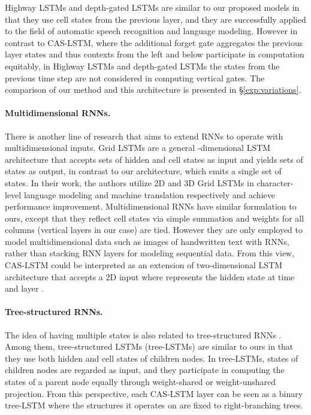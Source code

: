 \documentclass[wcp]{jmlr}
\begin{document}
    Highway LSTMs \citep{zhang2016highway} and depth-gated LSTMs \citep{yao2015depth} are similar to our proposed models in that they use cell states from the previous layer, and they are successfully applied to the field of automatic speech recognition and language modeling.
    However in contrast to CAS-LSTM, where the additional forget gate aggregates the previous layer states and thus contexts from the left and below participate in computation equitably, in Highway LSTMs and depth-gated LSTMs the states from the previous time step are not considered in computing vertical gates.
    The comparison of our method and this architecture is presented in \S\ref{exp:variations}.
    
    \paragraph{Multidimensional RNNs.}
    There is another line of research that aims to extend RNNs to operate with multidimensional inputs.
    Grid LSTMs \citep{kalchbrenner2016grid} are a general -dimensional LSTM architecture that accepts  sets of hidden and cell states as input and yields  sets of states as output, in contrast to our architecture, which emits a single set of states.
    In their work, the authors utilize 2D and 3D Grid LSTMs in character-level language modeling and machine translation respectively and achieve performance improvement.
    Multidimensional RNNs \citep{graves2007mdrnn,graves2009offline} have similar formulation to ours, except that they reflect cell states via simple summation and weights for all columns (vertical layers in our case) are tied.
    However they are only employed to model multidimensional data such as images of handwritten text with RNNs, rather than stacking RNN layers for modeling sequential data.
    From this view, CAS-LSTM could be interpreted as an extension of two-dimensional LSTM architecture that accepts a 2D input  where  represents the hidden state at time  and layer .
    
    \paragraph{Tree-structured RNNs.}
    The idea of having multiple states is also related to tree-structured RNNs \citep{goller1996learning,socher2011parsing}.
    Among them, tree-structured LSTMs (tree-LSTMs) \citep{tai2015treelstm,zhu2015treelstm,le2015treelstm} are similar to ours in that they use both hidden and cell states of children nodes.
    In tree-LSTMs, states of children nodes are regarded as input, and they participate in computing the states of a parent node equally through weight-shared or weight-unshared projection.
    From this perspective, each CAS-LSTM layer can be seen as a binary tree-LSTM where the structures it operates on are fixed to right-branching trees.
    
\end{document}
